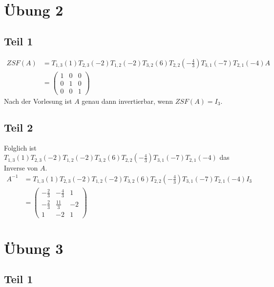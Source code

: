 \documentclass[a4paper,10pt]{article}
\begin{document}
\section*{Übung 2}

\subsection*{Teil 1}

\begin{align*}
 ZSF(A) & = T_{1,3}(1)T_{2,3}(-2)T_{1,2}(-2)T_{3,2}(6)T_{2,2}(-\frac{4}{3})T_{3,1}(-7)T_{2,1}(-4)A\\
  & =
  \begin{pmatrix}
   1 & 0 & 0\\
   0 & 1 & 0\\
   0 & 0 & 1
  \end{pmatrix}
\end{align*}
Nach der Vorlesung ist $A$ genau dann invertierbar, wenn $ZSF(A) = I_3$.

\subsection*{Teil 2}

Folglich ist $T_{1,3}(1)T_{2,3}(-2)T_{1,2}(-2)T_{3,2}(6)T_{2,2}(-\frac{4}{3})T_{3,1}(-7)T_{2,1}(-4)$ das Inverse von $A$.
\begin{align*}
 A^{-1} & = T_{1,3}(1)T_{2,3}(-2)T_{1,2}(-2)T_{3,2}(6)T_{2,2}(-\frac{4}{3})T_{3,1}(-7)T_{2,1}(-4)I_3\\
 & =
  \begin{pmatrix}
   -\frac{2}{3} & -\frac{4}{3} & 1\\
   -\frac{2}{3} & \frac{11}{3} & -2\\
   1 & -2 & 1
  \end{pmatrix}
\end{align*}

\section*{Übung 3}

\subsection*{Teil 1}
\end{document}
